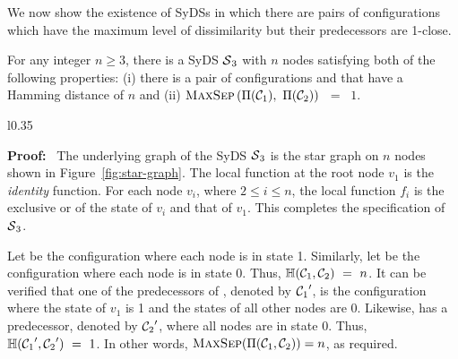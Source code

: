 \smallskip

We now show the existence of SyDSs in which there 
are pairs of configurations which have the maximum level 
of dissimilarity but their predecessors are 1-close. 

\begin{proposition}\label{pro:far-close}
For any integer $n \geq 3$,
there is a SyDS $\mbox{$\mathcal{S}$}_3${} with $n$
nodes satisfying both of the following properties: 
(i) there is a pair of configurations
\calcone{} and \calctwo{} that have a Hamming distance of $n$  and 
(ii) $\mbox{\textsc{MaxSep}}\left( \mbox{$\Pi(\mbox{$\mathcal{C}_{1}$})$},~ \mbox{$\Pi(\mbox{$\mathcal{C}_{2}$})$} \right)$ ~=~ $1$.
\end{proposition}

\begin{wrapfigure}[11]{l}{0.35\textwidth}
\centering

\caption{\small{Star graph used in the proof of
Proposition~\ref{pro:far-close}.}}
\label{fig:star-graph}
\smallskip
\end{wrapfigure}
\noindent
\textbf{Proof:}~ The underlying graph of the SyDS $\mbox{$\mathcal{S}$}_3$ is
the star graph on $n$ nodes shown in Figure~\ref{fig:star-graph}.
The local function at the root node $v_1$ is the \emph{identity}
function.
For each node $v_i$, where $2 \leq i \leq n$, the local function
$f_i$ is the exclusive or of the state of $v_i$ and that of $v_1$.  
This completes the specification of $\mbox{$\mathcal{S}$}_3$.

Let \calcone{} be the configuration where each node is in state 1.
Similarly, let \calctwo{} be the configuration where each node is in state 0.
Thus, $\mbox{$\mathbb{H}$}(\mbox{$\mathcal{C}_{1}$}, \mbox{$\mathcal{C}_{2}$}) ~=~ n$.
It can be verified that one of the predecessors of \calcone, 
denoted by $\mbox{$\mathcal{C}_{1}$}'$, is
the configuration where the state of $v_1$ is 1 and the states of all other
nodes are 0.
Likewise, \calctwo{} has a predecessor, denoted by $\mbox{$\mathcal{C}_{2}$}'$,
where all nodes are in state 0.
Thus, $\mbox{$\mathbb{H}$}(\mbox{$\mathcal{C}_{1}$}', \mbox{$\mathcal{C}_{2}$}') ~=~ 1$.
In other words, $\mbox{\textsc{MaxSep}}(\Pi(\mbox{$\mathcal{C}_{1}$}, \mbox{$\mathcal{C}_{2}$})) = n$, as required. \QED
